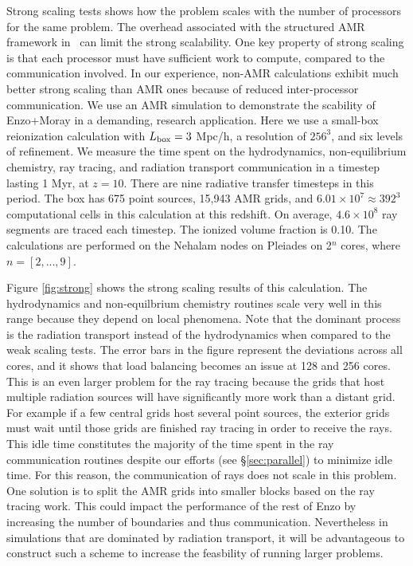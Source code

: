 \documentclass[useAMS,usenatbib]{mn2e}
\begin{document}
Strong scaling tests shows how the problem scales with the number of
processors for the same problem.  The overhead associated with the
structured AMR framework in \enzo~can limit the strong scalability.
One key property of strong scaling is that each processor must have
sufficient work to compute, compared to the communication involved.
In our experience, non-AMR calculations exhibit much better strong
scaling than AMR ones because of reduced inter-processor
communication.  We use an AMR simulation to demonstrate the scability
of Enzo+Moray in a demanding, research application.  Here we use a
small-box reionization calculation with $L_{\rm box} = 3$ Mpc/h, a
resolution of $256^3$, and six levels of refinement.  We measure the
time spent on the hydrodynamics, non-equilibrium chemistry, ray
tracing, and radiation transport communication in a timestep lasting 1
Myr, at $z=10$.  There are nine radiative transfer timesteps in this
period.  The box has 675 point sources, 15,943 AMR grids, and $6.01
\times 10^7 \approx 392^3$ computational cells in this calculation at
this redshift.  On average, $4.6 \times 10^8$ ray segments are traced
each timestep.  The ionized volume fraction is 0.10.  The calculations
are performed on the Nehalam nodes on Pleiades on 2$^n$ cores, where
$n = [2,...,9]$.

Figure \ref{fig:strong} shows the strong scaling results of this
calculation.  The hydrodynamics and non-equilbrium chemistry routines
scale very well in this range because they depend on local phenomena.
Note that the dominant process is the radiation transport instead of
the hydrodynamics when compared to the weak scaling tests.  The error
bars in the figure represent the deviations across all cores, and it
shows that load balancing becomes an issue at 128 and 256 cores.  This
is an even larger problem for the ray tracing because the grids that
host multiple radiation sources will have significantly more work than
a distant grid.  For example if a few central grids host several point
sources, the exterior grids must wait until those grids are finished
ray tracing in order to receive the rays.  This idle time constitutes
the majority of the time spent in the ray communication routines
despite our efforts (see \S\ref{sec:parallel}) to minimize idle time.
For this reason, the communication of rays does not scale in this
problem.  One solution is to split the AMR grids into smaller blocks
based on the ray tracing work.  This could impact the performance of
the rest of Enzo by increasing the number of boundaries and thus
communication.  Nevertheless in simulations that are dominated by
radiation transport, it will be advantageous to construct such a
scheme to increase the feasbility of running larger problems.
\end{document}

